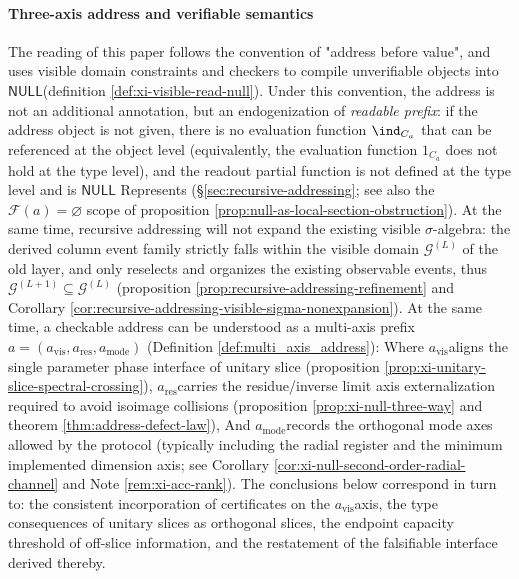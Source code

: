 \paragraph{Three-axis address and verifiable semantics}
The reading of this paper follows the convention of "address before value", and uses visible domain constraints and checkers to compile unverifiable objects into \(\mathsf{NULL}\) ​​(definition \ref{def:xi-visible-read-null}).
Under this convention, the address is not an additional annotation, but an endogenization of \emph{readable prefix}: if the address object is not given, there is no evaluation function \(\ind_{C_a}\) that can be referenced at the object level (equivalently, the evaluation function \(1_{C_a}\) does not hold at the type level), and the readout partial function is not defined at the type level and is \(\mathsf{NULL}\) Represents (\S\ref{sec:recursive-addressing}; see also the \(\mathscr{F}(a)=\varnothing\) scope of proposition \ref{prop:null-as-local-section-obstruction}).
At the same time, recursive addressing will not expand the existing visible \(\sigma\)-algebra: the derived column event family strictly falls within the visible domain \(\mathcal{G}^{(L)}\) of the old layer, and only reselects and organizes the existing observable events, thus \(\mathcal{G}^{(L+1)}\subseteq \mathcal{G}^{(L)}\) (proposition \ref{prop:recursive-addressing-refinement} and Corollary \ref{cor:recursive-addressing-visible-sigma-nonexpansion}).
At the same time, a checkable address can be understood as a multi-axis prefix
\(
a=(a_{\mathrm{vis}},a_{\mathrm{res}},a_{\mathrm{mode}})
\)
(Definition \ref{def:multi_axis_address}):
Where \(a_{\mathrm{vis}}\) ​​aligns the single parameter phase interface of unitary slice (proposition \ref{prop:xi-unitary-slice-spectral-crossing}),
\(a_{\mathrm{res}}\) ​​carries the residue/inverse limit axis externalization required to avoid isoimage collisions (proposition \ref{prop:xi-null-three-way} and theorem \ref{thm:address-defect-law}),
And \(a_{\mathrm{mode}}\) ​​records the orthogonal mode axes allowed by the protocol (typically including the radial register and the minimum implemented dimension axis; see Corollary \ref{cor:xi-null-second-order-radial-channel} and Note \ref{rem:xi-acc-rank}).
The conclusions below correspond in turn to: the consistent incorporation of certificates on the \(a_{\mathrm{vis}}\) ​​axis, the type consequences of unitary slices as orthogonal slices, the endpoint capacity threshold of off-slice information, and the restatement of the falsifiable interface derived thereby.

